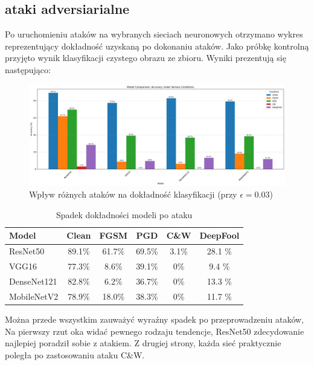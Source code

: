 \documentclass{article}
\begin{document}
\subsection{ataki adversiarialne}
Po uruchomieniu ataków na wybranych sieciach neuronowych otrzymano wykres reprezentujący dokładność uzyskaną po dokonaniu ataków. Jako próbkę kontrolną przyjęto wynik klasyfikacji czystego obrazu ze zbioru. Wyniki prezentują się następująco:
\begin{figure}[H]
    \centering
    \includegraphics[width=1\textwidth]{model_comparison.png} %
    \caption{Wpływ różnych ataków na dokładność klasyfikacji (przy $\epsilon = 0.03$)}
\end{figure}

\begin{table}[H]
    \centering
    \begin{tabular}{|l|c|c|c|c|c|}
    \hline
    \textbf{Model} & \textbf{Clean} & \textbf{FGSM} & \textbf{PGD} & \textbf{C\&W} & \textbf{DeepFool} \\
    \hline
    ResNet50 & 89.1\% & 61.7\% & 69.5\% & 3.1\% & 28.1 \% \\
    VGG16 & 77.3\% & 8.6\% & 39.1\% & 0\% & 9.4 \% \\
    DenseNet121 & 82.8\% & 6.2\% & 36.7\% & 0\% & 13.3 \% \\
    MobileNetV2 & 78.9\% & 18.0\% & 38.3\% & 0\% & 11.7 \% \\
    \hline
    \end{tabular}
    \caption{Spadek dokładności modeli po ataku}
\end{table}

Można przede wszystkim zauważyć wyraźny spadek po przeprowadzeniu ataków, Na pierwszy rzut oka widać pewnego rodzaju tendencje, ResNet50 zdecydowanie najlepiej poradził sobie z atakiem. Z drugiej strony, każda sieć praktycznie poległa po zastosowaniu ataku C\&W.
\end{document}
